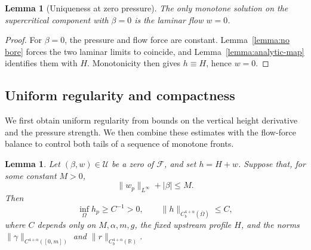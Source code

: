 \documentclass[12pt,letterpaper]{amsart}
\newtheorem{lemma}[theorem]{Lemma}
\numberwithin{equation}{section}
\begin{document}
\begin{lemma}[Uniqueness at zero pressure]\label{lem:zeropressure}
	  {The only monotone solution on the supercritical component with $\beta=0$ is the laminar flow $w=0$.}
\end{lemma}
	\begin{proof}
		{For $\beta=0$, the pressure and flow force are constant. Lemma~\ref{lemma:no bore} forces the two laminar limits to coincide, and Lemma~\ref{lemma:analytic-map} identifies them with $H$. Monotonicity then gives $h\equiv H$, hence $w=0$.}
	\end{proof}
	
	
	
	
	\subsection{{Uniform regularity and compactness}} {We first obtain uniform regularity from bounds on the vertical height derivative and the pressure strength. We then combine these estimates with the flow-force balance to control both tails of a sequence of monotone fronts.}
	\begin{lemma}\label{lem:regularity}
		{Let $(\beta,w)\in\mathscr U$ be a zero of $\mathcal F$, and set $h=H+w$. Suppose that, for some constant $M>0$,}
		\begin{equation*}
			\|w_p\|_{L^\infty}+|\beta|\leq M.
		\end{equation*}		
				Then
		\begin{equation*}
			\inf_{\Omega}h_p\ge C^{-1}>0,\qquad
			\|h\|_{C_b^{4+\alpha}(\overline\Omega)}
\le C,
		\end{equation*}
		{where $C$ depends only on $M,\alpha,m,g$, the fixed upstream profile $H$, and the norms $\|\gamma\|_{C^{4+\alpha}([0,m])}$ and $\|r\|_{C_b^{4+\alpha}(\mathbb R)}$.}
	\end{lemma}
\end{document}
